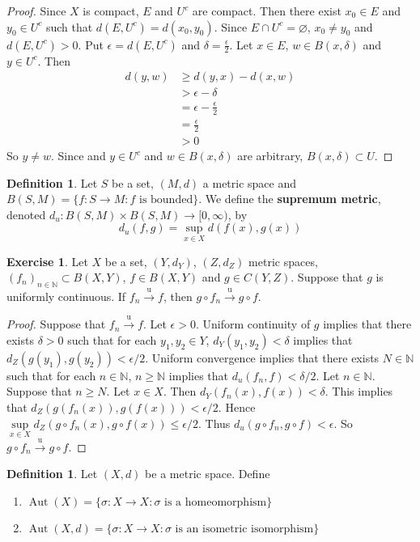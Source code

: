 \documentclass[12pt]{amsart}
\theoremstyle{definition}
\newtheorem{defn}[definition]{Definition}
\newtheorem{ex}[definition]{Exercise}
\newcommand{\del}{\delta}
\newcommand{\ep}{\epsilon}
\newcommand{\sig}{\sigma}
\newcommand{\N}{\mathbb{N}}
\newcommand{\tbf}[1]{\textbf{#1}}
\newcommand{\Rg}{[0,\infty)}
\newcommand{\convt}[1]{\xrightarrow{\text{#1}}}
\DeclareMathOperator{\Aut}{Aut}
\DeclareMathOperator*{\0}{\mbf{0}}
\DeclareMathOperator*{\1}{\mbf{1}}
\newcommand{\lex}[1]{\label{ex:#1}}
\newcommand{\ld}[1]{\label{defn:#1}}
\begin{document}
	\begin{proof}
	Since $X$ is compact, $E$ and $U^c$ are compact. Then there exist $x_0 \in E$ and $y_0 \in U^c$ such that $d(E, U^c) = d(x_0,y_0)$. Since $E \cap U^c = \varnothing$, $x_0 \neq y_0$ and $d(E, U^c) >0$. Put $\ep = d(E, U^c)$ and $\del = \frac{\ep}{2}$.  Let $x \in E$, $w \in B(x, \del)$ and $y \in U^c$. Then 
	\begin{align*}
	d(y, w) 
	&\geq d(y, x) - d(x, w) \\
	&> \ep - \del \\
	&= \ep - \frac{\ep}{2} \\
	&= \frac{\ep}{2} \\
	&> 0
\end{align*}	  
	So $y \neq w$. Since and $y \in U^c$ and $w \in B(x, \del)$ are arbitrary, $B(x, \del) \subset U$.
	\end{proof}
	
	\begin{defn} \ld{}
	Let $S$ be a set, $(M, d)$ a metric space and $B(S, M) = \{f: S \rightarrow M: f \text{ is bounded} \}$. We define the \tbf{supremum metric}, denoted $d_u:B(S,M) \times B(S,M) \rightarrow \Rg$, by $$d_u(f, g) = \sup_{x \in X}d(f(x), g(x)) $$ 
	\end{defn}
	
	\begin{ex} \lex{211111111}
	Let $X$ be a set, $(Y, d_Y)$, $(Z, d_Z)$ metric spaces, $(f_n)_{n \in \N} \subset B(X, Y)$, $f \in B(X, Y)$ and $g \in C(Y, Z)$. Suppose that $g$ is uniformly continuous. If $f_n \convt{u} f$, then $g \circ f_n \convt{u} g \circ f$. 
	\end{ex}
	
	\begin{proof}
	Suppose that $f_n \convt{u} f$. Let $\ep >0$. Uniform continuity of $g$ implies that there exists $\del >0$ such that for each $y_1, y_2 \in Y$, $d_Y(y_1, y_2) < \del$ implies that $d_Z(g(y_1), g(y_2)) < \ep/2$.  Uniform convergence implies that there exists $N \in \N$ such that for each $n \in \N$, $n \geq \N$ implies that $d_u(f_n, f) < \del/2$. Let $n \in \N$. Suppose that $n \geq N$. Let $x \in X$. Then $d_Y(f_n(x), f(x)) < \del$. This implies that $d_Z(g(f_n(x)), g(f(x))) < \ep/2$. Hence $\sup\limits_{x \in X} d_Z(g \circ f_n(x), g \circ f(x)) \leq \ep/2$. Thus $d_u(g \circ f_n , g \circ f) < \ep$. So $g \circ f_n \convt{u} g \circ f$.
	\end{proof}
	
	\begin{defn} \ld{}
	Let $(X, d)$ be a metric space. Define
	\begin{enumerate}
	\item $\Aut(X) = \{\sig:X \rightarrow X: \sig \text{ is a homeomorphism}\}$
	\item $\Aut(X, d) = \{\sig:X \rightarrow X: \sig \text{ is an isometric isomorphism}\}$
	\end{enumerate}
	\end{defn}
	
\end{document}
